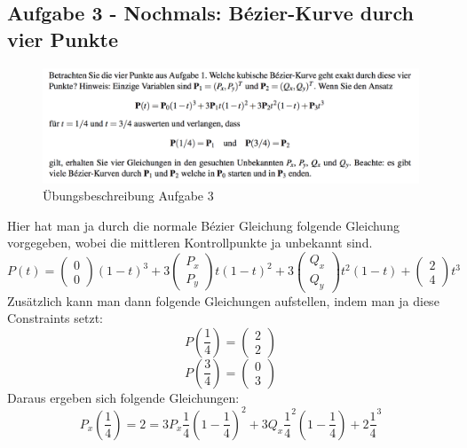 \subsection{Aufgabe 3 - Nochmals: Bézier-Kurve durch vier Punkte}
\begin{figure}[!ht]
	\centering
	\includegraphics[width=1\linewidth]{fig/ueb_curves_3}
	\caption{Übungsbeschreibung Aufgabe 3}
	\label{fig:ueb_curves_3}
\end{figure}
Hier hat man ja durch die normale Bézier Gleichung folgende Gleichung vorgegeben, wobei die mittleren Kontrollpunkte ja unbekannt sind.
\begin{displaymath}
P(t) =  \begin{pmatrix}0 \\ 0\end{pmatrix} (1-t)^3 + 3 \begin{pmatrix}P_x \\ P_y\end{pmatrix}t(1-t)^2+3 \begin{pmatrix}Q_x \\ Q_y\end{pmatrix}t^2(1-t)+ \begin{pmatrix}2 \\ 4\end{pmatrix}t^3
\end{displaymath}
Zusätzlich kann man dann folgende Gleichungen aufstellen, indem man ja diese Constraints setzt:
\begin{displaymath}
P\left(\frac{1}{4}\right) =  \begin{pmatrix}2 \\ 2\end{pmatrix}
\end{displaymath}
\begin{displaymath}
P\left(\frac{3}{4}\right) =  \begin{pmatrix}0 \\ 3\end{pmatrix}
\end{displaymath}
Daraus ergeben sich folgende Gleichungen:
\begin{displaymath}
P_x\left(\frac{1}{4}\right) = 2 = 3 P_x \frac{1}{4}\left(1-\frac{1}{4}\right)^2+3Q_x\frac{1}{4}^2\left(1-\frac{1}{4}\right)+2\frac{1}{4}^3
\end{displaymath}

